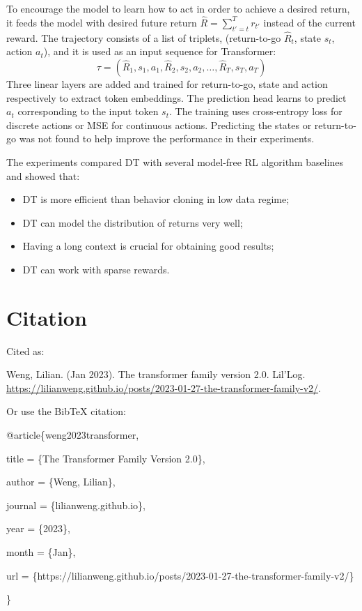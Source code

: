 \documentclass[12pt]{article}
\begin{document}
To encourage the model to learn how to act in order to achieve a desired return, it feeds the model with desired future return $\hat{R} = \sum_{t'=t}^T r_{t'}$ instead of the current reward. The trajectory consists of a list of triplets, (return-to-go $\hat{R}_t$, state $s_t$, action $a_t$), and it is used as an input sequence for Transformer:
\[
\tau = (\hat{R}_1, s_1, a_1, \hat{R}_2, s_2, a_2, \dots, \hat{R}_T, s_T, a_T)
\]
Three linear layers are added and trained for return-to-go, state and action respectively to extract token embeddings. The prediction head learns to predict $a_t$ corresponding to the input token $s_t$. The training uses cross-entropy loss for discrete actions or MSE for continuous actions. Predicting the states or return-to-go was not found to help improve the performance in their experiments.

The experiments compared DT with several model-free RL algorithm baselines and showed that:
\begin{itemize}
    \item DT is more efficient than behavior cloning in low data regime;
    \item DT can model the distribution of returns very well;
    \item Having a long context is crucial for obtaining good results;
    \item DT can work with sparse rewards.
\end{itemize}

\section{Citation}
Cited as:

\begin{tcolorbox}[colback=black!5!white, colframe=black!80!white, boxrule=0.5pt, arc=2mm, left=1mm, right=1mm, top=1mm, bottom=1mm]
Weng, Lilian. (Jan 2023). The transformer family version 2.0. Lil’Log. \url{https://lilianweng.github.io/posts/2023-01-27-the-transformer-family-v2/}.
\end{tcolorbox}

Or use the BibTeX citation:

\begin{tcolorbox}[
    colback=black!5!white,
    colframe=black!80!white,
    boxrule=0.5pt,
    arc=2mm,
    left=1mm,
    right=1mm,
    top=1mm,
    bottom=1mm,
    listing only,
    listing options={
      basicstyle=\ttfamily\footnotesize,
      breaklines=true,
      literate={\{}{{\char`\{}}1 {\}}{{\char`\}}}1
    }
  ]
@article\{weng2023transformer,

  title   = \{The Transformer Family Version 2.0\},

  author  = \{Weng, Lilian\},

  journal = \{lilianweng.github.io\},

  year    = \{2023\},

  month   = \{Jan\},

  url     = \{https://lilianweng.github.io/posts/2023-01-27-the-transformer-family-v2/\}

\}
\end{tcolorbox}
\end{document}
